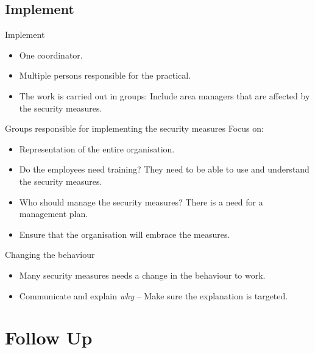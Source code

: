 \documentclass{beamer}
\begin{document}
\subsection{Implement}
\begin{frame}{Implement}
  \begin{itemize}
    \item One coordinator.
    \item Multiple persons responsible for the practical.
    \item The work is carried out in groups: Include area managers that are
      affected by the security measures.
  \end{itemize}
\end{frame}
\begin{frame}{Groups responsible for implementing the security measures}
  Focus on:
  \begin{itemize}
    \item Representation of the entire organisation.
    \item Do the employees need training?
      They need to be able to use and understand the security measures.
    \item Who should manage the security measures?
      There is a need for a management plan.
    \item Ensure that the organisation will embrace the measures.
  \end{itemize}
\end{frame}
\begin{frame}{Changing the behaviour}
  \begin{itemize}
    \item Many security measures needs a change in the behaviour to work.
    \item Communicate and explain \emph{why} -- Make sure the explanation is
      targeted.
  \end{itemize}
\end{frame}


\section{Follow Up}
\end{document}
